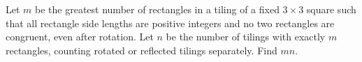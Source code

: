 Let $m$ be the greatest number of rectangles in a tiling of a fixed $3\times3$ square such that all rectangle side lengths are positive integers and no two rectangles are congruent, even after rotation. Let $n$ be the number of tilings with exactly $m$ rectangles, counting rotated or reflected tilings separately. Find $mn$.

